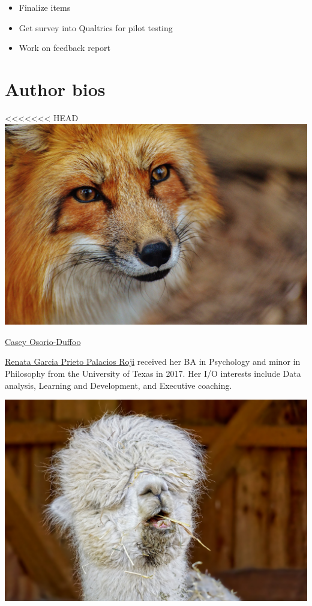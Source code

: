 \documentclass[
]{book}
\providecommand{\tightlist}{%
  \setlength{\itemsep}{0pt}\setlength{\parskip}{0pt}}
\begin{document}
\begin{itemize}
\tightlist
\item
  Finalize items
\item
  Get survey into Qualtrics for pilot testing
\item
  Work on feedback report
\end{itemize}

\hypertarget{author-bios}{%
\chapter{Author bios}\label{author-bios}}

<<<<<<< HEAD
\includegraphics{casey.jpg}

\href{mailto:osorioduffc1@montclair.edu}{Casey Osorio-Duffoo}

\href{mailto:garciaprier1@mail.montclair.edu}{Renata Garcia Prieto Palacios Roji} received her BA in Psychology and minor in Philosophy from the University of Texas in 2017. Her I/O interests include Data analysis, Learning and Development, and Executive coaching.

\includegraphics{renata.jpg}
\end{document}

